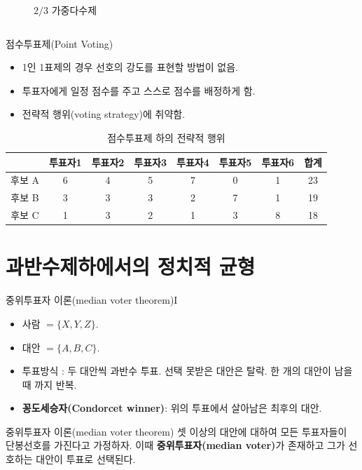 \documentclass[aspectratio=169,xcolor=dvipsnames,handout]{beamer}
\begin{document}
\begin{frame}
\begin{columns}
\begin{column}{.5\textwidth}
\begin{figure}
                \caption{$2/3$ 가중다수제}
            \end{figure}
        \end{column}    
    \end{columns}
\end{frame}

\begin{frame}{점수투표제(Point Voting)}
    \begin{itemize}[<+->]
        \item 1인 1표제의 경우 선호의 강도를 표현할 방법이 없음.
        \item 투표자에게 일정 점수를 주고 스스로 점수를 배정하게 함.
        \item 전략적 행위(voting strategy)에 취약함.
    \end{itemize}
    \pause
    \begin{table}
        \centering
        \begin{tabular}{c|c|c|c|c|c|c|c}
            \toprule
                          & 투표자1 & 투표자2 & 투표자3 & 투표자4 & 투표자5 & 투표자6 & 합계 \\
            \hline 후보 A & 6 & 4 & 5 & 7 & 0 & 1 & 23 \\
                   후보 B & 3 & 3 & 3 & 2 & 7 & 1 & 19 \\
                   후보 C & 1 & 3 & 2 & 1 & 3 & 8 & 18 \\
            \bottomrule
        \end{tabular}
        \caption{점수투표제 하의 전략적 행위}
    \end{table}
\end{frame}

\section{과반수제하에서의 정치적 균형}


\begin{frame}{중위투표자 이론(median voter theorem)I}
    \begin{itemize}[<+->]
        \item 사람 $ = \{X, Y, Z \}$.
        \item 대안 $ = \{A, B, C \}$.
        \item 투표방식 : 두 대안씩 과반수 투표. 선택 못받은 대안은 탈락. 한 개의 대안이 남을 때 까지 반복.
        \item {\bf 꽁도세승자(Condorcet winner)}: 위의 투표에서 살아남은 최후의 대안.
    \end{itemize}
    \begin{block}{중위투표자 이론(median voter theorem)}
      셋 이상의 대안에 대하여 모든 투표자들이 단봉선호를 가진다고 가정하자. 이때 {\bf 중위투표자(median voter)}가 존재하고 그가 선호하는 대안이 투표로 선택된다. 
    \end{block}
\end{frame}
\end{document}
